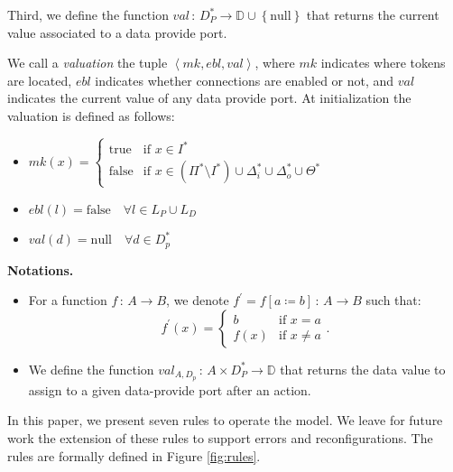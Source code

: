 Third, we define the function
$val\,:\,D_{P}^{*}\rightarrow \mathbb{D}\cup\left\{ \text{null}\right\}$
that returns the current value associated to a data provide port.

We call a \emph{valuation} the tuple $\left\langle mk,ebl,val\right\rangle$,
where $mk$ indicates where tokens are located, $ebl$ indicates whether
connections are enabled or not, and $val$ indicates the current value
of any data provide port.
At initialization the valuation is defined as follows:
\begin{itemize}
\item $mk\left(x\right)=\begin{cases}
\text{true} & \text{if }x\in I^{*}\\
\text{false} & \text{if } x\in\left(\Pi^{*}\setminus I^*\right)\cup\Delta_{i}^{*}\cup\Delta_{o}^{*}\cup\Theta^{*}
\end{cases}$
\item $ebl\left(l\right)=\text{false}\quad\forall l \in L_{P}\cup L_{D}$
\item $val\left(d\right)=\text{null}\quad\forall d \in D^*_{p}$
\end{itemize}

\noindent\textbf{Notations.}
\begin{itemize}
  \item For a function $f\,:\,A\rightarrow B$, we denote $f^{\prime}=f\left[a\coloneqq b\right]\,:\,A\rightarrow B$ such that:
    \begin{equation*}
      f^{\prime}\left(x\right)=\begin{cases}
      b & \text{if }x=a\\
      f\left(x\right) & \text{if }x\neq a
      \end{cases}.
    \end{equation*}
  \item We define the function $val_{A,D_p}\,:\,A\times
    D_{P}^*\rightarrow \mathbb{D}$ that returns the data value to assign to a
    given data-provide port after an action.
\end{itemize}
    
In this paper, we present seven rules to operate the \mad model. We
leave for future work the extension of these rules to support errors
and reconfigurations. The rules are formally defined in
Figure \ref{fig:rules}.

